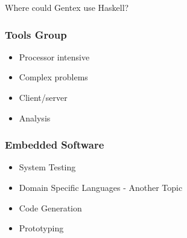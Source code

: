 \begin{frame}
  Where could Gentex use Haskell?
\end{frame}

\begin{frame}
  \frametitle{Tools Group}
  \pause
  \begin{itemize}[<+->]
    \item Processor intensive
    \item Complex problems
    \item Client/server
    \item Analysis
  \end{itemize}
\end{frame}

\begin{frame}
  \frametitle{Embedded Software}
  \pause
  \begin{itemize}[<+->]
    \item System Testing
    \item Domain Specific Languages - Another Topic
    \item Code Generation
    \item Prototyping
  \end{itemize}
\end{frame}
